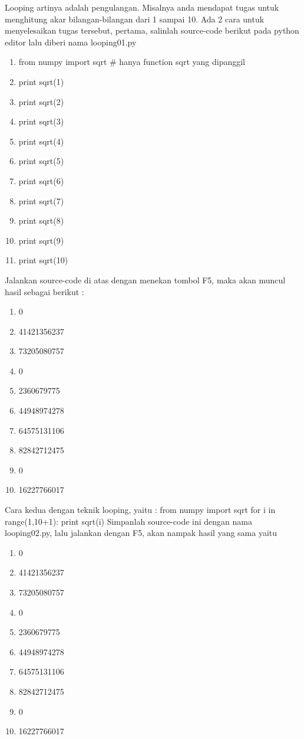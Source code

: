 Looping artinya adalah pengulangan. Misalnya anda mendapat tugas untuk menghitung akar bilangan-bilangan dari 1 sampai 10. Ada 2 cara untuk menyelesaikan tugas tersebut, pertama, salinlah source-code berikut pada python editor lalu diberi nama looping01.py
\begin{enumerate}
\item from numpy import sqrt # hanya function sqrt yang dipanggil
\item print sqrt(1)
\item print sqrt(2)
\item print sqrt(3)
\item print sqrt(4)
\item print sqrt(5)
\item print sqrt(6)
\item print sqrt(7)
\item print sqrt(8)
\item print sqrt(9)
\item print sqrt(10)
\end{enumerate}
Jalankan source-code di atas dengan menekan tombol F5, maka akan muncul hasil sebagai berikut :
\begin{enumerate}
\item 0
\item 41421356237
\item 73205080757
\item 0
\item 2360679775
\item 44948974278
\item 64575131106
\item 82842712475
\item 0
\item 16227766017
\end{enumerate}
Cara kedua dengan teknik looping, yaitu :
from numpy import sqrt
for i in range(1,10+1):
print sqrt(i)
Simpanlah source-code ini dengan nama looping02.py, lalu jalankan dengan F5, akan nampak
hasil yang sama yaitu
\begin{enumerate}
\item 0
\item 41421356237
\item 73205080757
\item 0
\item 2360679775
\item 44948974278
\item 64575131106
\item 82842712475
\item 0
\item 16227766017
\end{enumerate}

